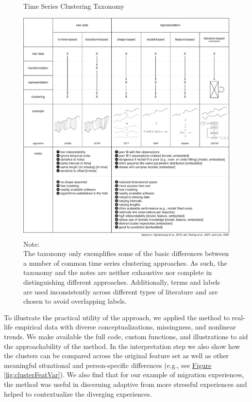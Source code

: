\documentclass[man, 12pt, a4paper, mask, floatsintext]{apa7}
\theoremstyle{break}
\theoremstyle{plain}
\newcommand{\fgrref}[2][]{\hyperref[#2]{Figure \ref*{#2}#1}}
\begin{document}
\begin{figure}[!hbtp] %
  \caption{Time Series Clustering Taxonomy}
  \label{fig:tsClustTax}
  \centering\includegraphics[width=\textwidth]{figures/TS Cluster Flow/tsClustTax.pdf}
  \caption*{Note: \\
  The taxonomy only exemplifies some of the basic differences between a number of common time series clustering approaches. As such, the taxonomy and the notes are neither exhaustive nor complete in distinguishing different approaches. Additionally, terms and labels are used inconsistently across different types of literature and are chosen to avoid overlapping labels.}
\end{figure}

To illustrate the practical utility of the approach, we applied the method to real-life empirical data with diverse conceptualizations, missingness, and nonlinear trends. We make available the full code, custom functions, and illustrations to aid the approachability of the method. In the interpretation step we also show how the clusters can be compared across the original feature set as well as other meaningful situational and person-specific differences (e.g., see \fgrref{fig:clusterFeatVar}). We also find that for our example of migration experiences, the method was useful in discerning adaptive from more stressful experiences and helped to contextualize the diverging experiences.
\end{document}
